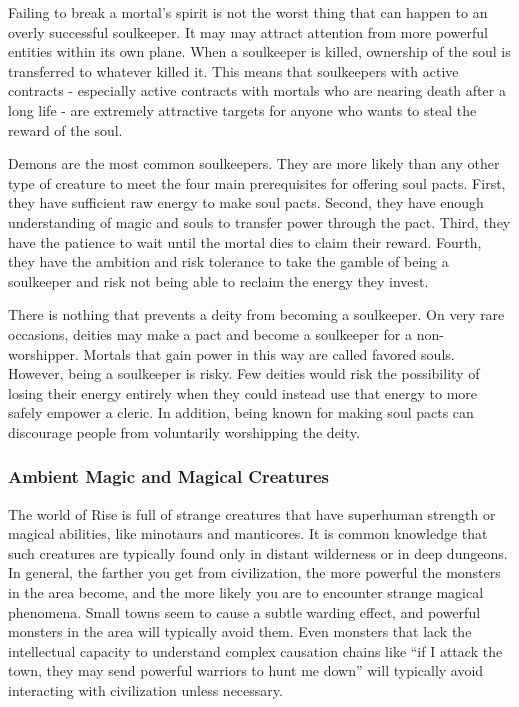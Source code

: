             Failing to break a mortal's spirit is not the worst thing that can happen to an overly successful soulkeeper.
            It may may attract attention from more powerful entities within its own plane.
            When a soulkeeper is killed, ownership of the soul is transferred to whatever killed it.
            This means that soulkeepers with active contracts - especially active contracts with mortals who are nearing death after a long life - are extremely attractive targets for anyone who wants to steal the reward of the soul.

            Demons are the most common soulkeepers.
            They are more likely than any other type of creature to meet the four main prerequisites for offering soul pacts.
            First, they have sufficient raw energy to make soul pacts.
            Second, they have enough understanding of magic and souls to transfer power through the pact.
            Third, they have the patience to wait until the mortal dies to claim their reward.
            Fourth, they have the ambition and risk tolerance to take the gamble of being a soulkeeper and risk not being able to reclaim the energy they invest.

            There is nothing that prevents a deity from becoming a soulkeeper.
            On very rare occasions, deities may make a pact and become a soulkeeper for a non-worshipper.
            Mortals that gain power in this way are called favored souls.
            However, being a soulkeeper is risky.
            Few deities would risk the possibility of losing their energy entirely when they could instead use that energy to more safely empower a cleric.
            In addition, being known for making soul pacts can discourage people from voluntarily worshipping the deity.

        \subsubsection{Ambient Magic and Magical Creatures}
            The world of Rise is full of strange creatures that have superhuman strength or magical abilities, like minotaurs and manticores.
            It is common knowledge that such creatures are typically found only in distant wilderness or in deep dungeons.
            In general, the farther you get from civilization, the more powerful the monsters in the area become, and the more likely you are to encounter strange magical phenomena.
            Small towns seem to cause a subtle warding effect, and powerful monsters in the area will typically avoid them.
            Even monsters that lack the intellectual capacity to understand complex causation chains like ``if I attack the town, they may send powerful warriors to hunt me down'' will typically avoid interacting with civilization unless necessary.

